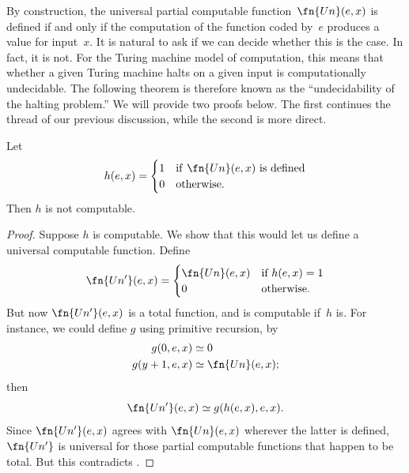 \documentclass[../../../include/open-logic-section]{subfiles}
\begin{document}

By construction, the universal partial computable
function~$\fn{Un}(e,x)$ is defined if and only if the computation of
the function coded by~$e$ produces a value for input~$x$. It is
natural to ask if we can decide whether this is the case. In fact, it
is not. For the Turing machine model of computation, this means that
whether a given Turing machine halts on a given input is
computationally undecidable. The following theorem is therefore known
as the ``undecidability of the halting problem.'' We will provide two
proofs below. The first continues the thread of our previous
discussion, while the second is more direct.

\begin{thm}
Let
\[
h(e, x)  =
\begin{cases}
1 & \text{if\/ $\fn{Un}(e, x)$ is defined} \\
0 & \text{otherwise.}
\end{cases}
\]
Then $h$ is not computable.
\end{thm}

\begin{proof}
Suppose $h$ is computable. We show that this would let us define a
universal computable function. Define
\[
\fn{Un'}(e,x) =
\begin{cases}
\fn{Un}(e,x) & \text{if $h(e,x) = 1$} \\
0 & \text{otherwise.}
\end{cases}
\]
But now $\fn{Un'}(e, x)$ is a total function, and is computable if~$h$
is. For instance, we could define $g$ using primitive recursion, by
\begin{align*}
g(0, e, x) & \simeq 0 \\
g(y+1, e, x) & \simeq \fn{Un}(e,x);
\end{align*}
then
\[
\fn{Un'}(e,x) \simeq g(h(e,x),e,x).
\]
Since $\fn{Un'}(e,x)$ agrees with $\fn{Un}(e,x)$ wherever the latter
is defined, $\fn{Un'}$ is universal for those partial computable
functions that happen to be total. But this contradicts
.
\end{proof}
\end{document}

